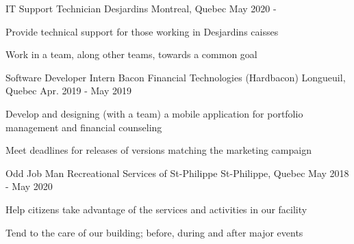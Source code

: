 

\begin{cventries}

  \cventry
    {IT Support Technician} %
    {Desjardins} %
    {Montreal, Quebec} %
    {May 2020 - } %
    {
      \begin{cvitems} %
        \item {Provide technical support for those working in Desjardins caisses}
        \item {Work in a team, along other teams, towards a common goal}
      \end{cvitems}
    }
    
  \cventry
    {Software Developer Intern} %
    {Bacon Financial Technologies (Hardbacon)} %
    {Longueuil, Quebec} %
    {Apr. 2019 - May 2019} %
    {
      \begin{cvitems} %
        \item {Develop and designing (with a team) a mobile application for portfolio management and financial counseling}
        \item {Meet deadlines for releases of versions matching the marketing campaign}
      \end{cvitems}
    }
    
  \cventry
    {Odd Job Man} %
    {Recreational Services of St-Philippe} %
    {St-Philippe, Quebec} %
    {May 2018 - May 2020} %
    {
      \begin{cvitems} %
        \item {Help citizens take advantage of the services and activities in our facility}
        \item {Tend to the care of our building; before, during and after major events}
      \end{cvitems}
    }

\end{cventries}
